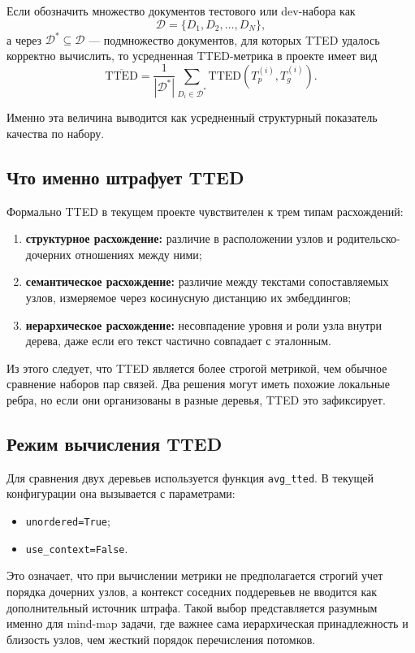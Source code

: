 \documentclass[12pt,a4paper]{article}
\begin{document}
Если обозначить множество документов тестового или dev-набора как
\[
\mathcal{D} = \{D_1, D_2, \dots, D_N\},
\]
а через $\mathcal{D}^{*} \subseteq \mathcal{D}$ --- подмножество документов, для которых
TTED удалось корректно вычислить, то усредненная TTED-метрика в проекте имеет вид
\[
\overline{\mathrm{TTED}} = \frac{1}{|\mathcal{D}^{*}|}
\sum_{D_i \in \mathcal{D}^{*}} \mathrm{TTED}(T_p^{(i)}, T_g^{(i)}).
\]

Именно эта величина выводится как усредненный структурный показатель качества по набору.

\subsection{Что именно штрафует TTED}

Формально TTED в текущем проекте чувствителен к трем типам расхождений:

\begin{enumerate}
    \item \textbf{структурное расхождение:} различие в расположении узлов и родительско-
    дочерних отношениях между ними;
    \item \textbf{семантическое расхождение:} различие между текстами сопоставляемых узлов,
    измеряемое через косинусную дистанцию их эмбеддингов;
    \item \textbf{иерархическое расхождение:} несовпадение уровня и роли узла внутри
    дерева, даже если его текст частично совпадает с эталонным.
\end{enumerate}

Из этого следует, что TTED является более строгой метрикой, чем обычное сравнение
наборов пар связей. Два решения могут иметь похожие локальные ребра, но если они
организованы в разные деревья, TTED это зафиксирует.

\subsection{Режим вычисления TTED}

Для сравнения двух деревьев используется функция \texttt{avg\_tted}. В текущей
конфигурации она вызывается с параметрами:

\begin{itemize}
    \item \texttt{unordered=True};
    \item \texttt{use\_context=False}.
\end{itemize}

Это означает, что при вычислении метрики не предполагается строгий учет порядка дочерних
узлов, а контекст соседних поддеревьев не вводится как дополнительный источник штрафа.
Такой выбор представляется разумным именно для mind-map задачи, где важнее сама
иерархическая принадлежность и близость узлов, чем жесткий порядок перечисления потомков.
\end{document}
